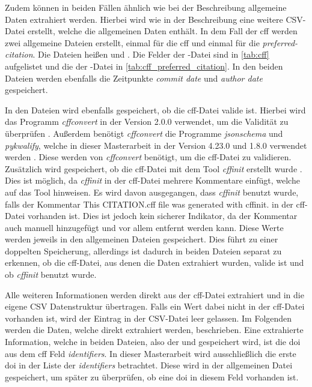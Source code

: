 Zudem können in beiden Fällen ähnlich wie bei der Beschreibung allgemeine Daten extrahiert werden.
Hierbei wird wie in der Beschreibung eine weitere CSV-Datei erstellt, welche die allgemeinen Daten enthält.
In dem Fall der \gls{cff} werden zwei allgemeine Dateien erstellt, einmal für die \gls{cff} und einmal für die \emph{preferred-citation}.
Die Dateien heißen  und .
Die Felder der -Datei sind in \autoref{tab:cff} aufgelistet und die der -Datei in \autoref{tab:cff_preferred_citation}.
In den beiden Dateien werden ebenfalls die Zeitpunkte \emph{commit date} und \emph{author date} gespeichert.

In den Dateien wird ebenfalls gespeichert, ob die \gls{cff}-Datei valide ist.
Hierbei wird das Programm \emph{cffconvert} in der Version 2.0.0 verwendet, um die Validität zu überprüfen \autocite{spaaks_cffconvert_2021}.
Außerdem benötigt \emph{cffconvert} die Programme \emph{jsonschema} und \emph{pykwalify}, welche in dieser Masterarbeit in der Version 4.23.0 und 1.8.0 verwendet werden \autocites{berman_jsonschema_2024}{grokzen_pykwalify_2020}.
Diese werden von \emph{cffconvert} benötigt, um die \gls{cff}-Datei zu validieren.
Zusätzlich wird gespeichert, ob die \gls{cff}-Datei mit dem Tool \emph{cffinit} erstellt wurde \autocite{spaaks_cffinit_2023}.
Dies ist möglich, da \emph{cffinit} in der \gls{cff}-Datei mehrere Kommentare einfügt, welche auf das Tool hinweisen.
Es wird davon ausgegangen, dass \emph{cffinit} benutzt wurde, falls der Kommentar \glqq This CITATION.cff file was generated with cffinit.\grqq{} in der \gls{cff}-Datei vorhanden ist.
Dies ist jedoch kein sicherer Indikator, da der Kommentar auch manuell hinzugefügt und vor allem entfernt werden kann.
Diese Werte werden jeweils in den allgemeinen Dateien gespeichert.
Dies führt zu einer doppelten Speicherung, allerdings ist dadurch in beiden Dateien separat zu erkennen, ob die \gls{cff}-Datei, aus denen die Daten extrahiert wurden, valide ist und ob \emph{cffinit} benutzt wurde.

Alle weiteren Informationen werden direkt aus der \gls{cff}-Datei extrahiert und in die eigene CSV Datenstruktur übertragen.
Falls ein Wert dabei nicht in der \gls{cff}-Datei vorhanden ist, wird der Eintrag in der CSV-Datei leer gelassen.
Im Folgenden werden die Daten, welche direkt extrahiert werden, beschrieben.
Eine extrahierte Information, welche in beiden Dateien, also der  und  gespeichert wird, ist die \gls{doi} aus dem \gls{cff} Feld \emph{identifiers}.
In dieser Masterarbeit wird ausschließlich die erste \gls{doi} in der Liste der \emph{identifiers} betrachtet.
Diese wird in der allgemeinen Datei gespeichert, um später zu überprüfen, ob eine \gls{doi} in diesem Feld vorhanden ist.

